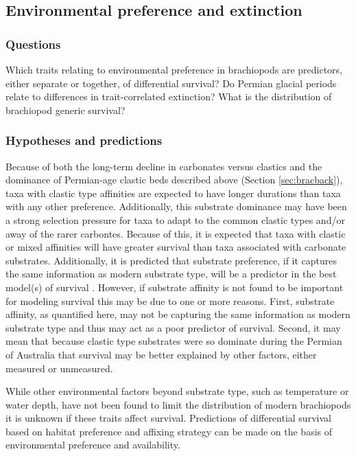 \documentclass[12pt,letterpaper]{article}
\begin{document}
\subsection{Environmental preference and extinction} \label{sec:bracsurv}
\subsubsection{Questions} \label{sec:bracsurvques}
Which traits relating to environmental preference in brachiopods are predictors, either separate or together, of differential survival? Do Permian glacial periods relate to differences in trait-correlated extinction? What is the distribution of brachiopod generic survival?

\subsubsection{Hypotheses and predictions} \label{sec:bracsurvpred}
Because of both the long-term decline in carbonates versus clastics \citep{Peters2008} and the dominance of Permian-age clastic beds \citep{Birgenheier2010,Percival2012,Thomas2007,Fielding2008a,Fielding2008} described above (Section \ref{sec:bracback}), taxa with clastic type affinities are expected to have longer durations than taxa with any other preference. Additionally, this substrate dominance may have been a strong selection pressure for taxa to adapt to the common clastic types and/or away of the rarer carbontes. Because of this, it is expected that taxa with clastic or mixed affinities will have greater survival than taxa associated with carbonate substrates. Additionally, it is predicted that substrate preference, if it captures the same information as modern substrate type, will be a predictor in the best model(s) of survival \citep{Richardson1997,Richardson1997a}. However, if substrate affinity is not found to be important for modeling survival this may be due to one or more reasons. First, substrate affinity, as quantified here, may not be capturing the same information as modern substrate type and thus may act as a poor predictor of survival. Second, it may mean that because clastic type substrates were so dominate during the Permian of Australia that survival may be better explained by other factors, either measured or unmeasured. 

While other environmental factors beyond substrate type, such as temperature or water depth, have not been found to limit the distribution of modern brachiopods \citep{Richardson1997,Richardson1997a} it is unknown if these traits affect survival. Predictions of differential survival based on habitat preference and affixing strategy can be made on the basis of environmental preference and availability.
\end{document}
